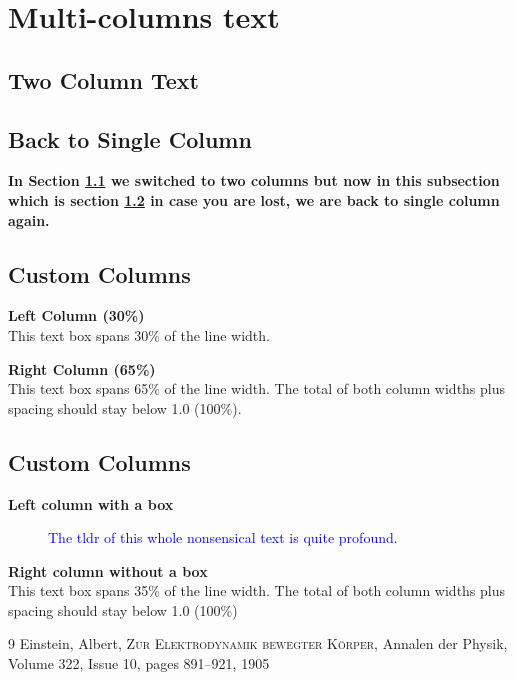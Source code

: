 \documentclass[12pt]{article}
\begin{document}
\twocolumn
\section{Multi-columns text}\label{sec:multicolumn}
\subsection{Two Column Text}\label{sec:2column}
\lipsum[1-4]

\onecolumn
\subsection{Back to Single Column}\label{sec:switchBack}
\textbf{In Section \ref{sec:2column} we switched to two columns but now in this subsection which is section \ref{sec:switchBack} in case you are lost, we are back to single column again.}\\
\lipsum[1]

\subsection{Custom Columns}\label{sec:minipages}
\begin{minipage}[t]{0.30\linewidth} %
    \textbf{Left Column (30\%)} \\
    This text box spans 30\% of the line width.\\
    \lipsum[1]
\end{minipage}
\hfill %
\begin{minipage}[t]{0.65\linewidth}
    \textbf{Right Column (65\%)} \\
    This text box spans 65\% of the line width. The total of both column widths plus spacing should stay below 1.0 (100\%).\\
    \lipsum[3]
\end{minipage}


\subsection{Custom Columns}
\begin{minipage}[t]{0.61\linewidth} %
    \textbf{Left column with a box} \\
    \lipsum[1]
    \begin{figure}
    \textcolor{blue}{The tldr of this whole nonsensical text is quite profound.}
    \end{figure}
    \lipsum[3]

\end{minipage}%
\hfill
\begin{minipage}[t]{0.35\linewidth}
    \textbf{Right column without a box} \\
    This text box spans 35\% of the line width. The total of both column widths plus spacing should stay below 1.0 (100\%)
    
    \lipsum[4]
\end{minipage}


\onecolumn
\begin{thebibliography}{9}
  {Einstein, Albert}, \textsc{Zur Elektrodynamik bewegter K{\"o}rper}, {Annalen der Physik}, Volume 322, Issue 10, pages 891--921, 1905
\end{thebibliography}
\end{document}

